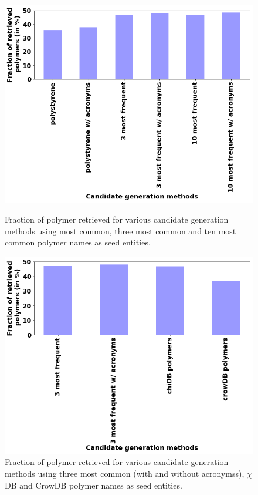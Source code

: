 
\begin{figure}
\centering
\begin{minipage}[b]{.4\textwidth}
\includegraphics[trim=0in 0.1in 0.1in 0.in,clip,width=1.0\textwidth]{figures/candidate_generation_method1.png}
\caption{\label{fig:cand_generation1} Fraction of polymer retrieved for various candidate generation methods using most common, three most common and ten most common polymer names as seed entities.
}
\end{minipage}\qquad
\begin{minipage}[b]{.4\textwidth}
\includegraphics[trim=0in 0.1in 0.1in 0.in,clip,width=1.0\textwidth]{figures/candidate_generation_method2.png}
\caption{\label{fig:cand_generation2} Fraction of polymer retrieved for various candidate generation methods using three most common (with and without acronymss), $\chi$DB and CrowDB polymer names as seed entities.  
}
\end{minipage}
\end{figure}

